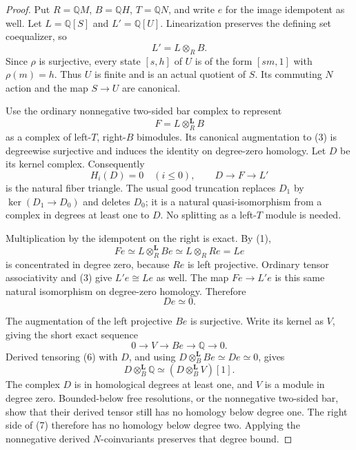 \begin{proof}
Put $R=\mathbb QM$, $B=\mathbb QH$, $T=\mathbb QN$, and write $e$
for the image idempotent as well.  Let $L=\mathbb Q[S]$ and
$L'=\mathbb Q[U]$.
Linearization preserves the defining set coequalizer, so
\[
 L'=L\otimes_R B.                                               \tag{3}
\]
Since $\rho$ is surjective, every state $[s,h]$ of $U$ is of the form
$[sm,1]$ with $\rho(m)=h$.  Thus $U$ is finite and is an actual quotient
of $S$.  Its commuting $N$ action and the map $S\to U$ are canonical.

Use the ordinary nonnegative two-sided bar complex to represent
\[
 F=L\otimes_R^{\mathbf L}B
\]
as a complex of left-$T$, right-$B$ bimodules.  Its canonical
augmentation to (3) is degreewise surjective and induces the identity
on degree-zero homology.  Let $D$ be its kernel complex.  Consequently
\[
 H_i(D)=0\quad(i\leq0),\qquad
 D\longrightarrow F\longrightarrow L'
                                                               \tag{4}
\]
is the natural fiber triangle.  The usual good truncation replaces
$D_1$ by $\ker(D_1\to D_0)$ and deletes $D_0$; it is a natural
quasi-isomorphism from a complex in degrees at least one to $D$.
No splitting as a left-$T$ module is needed.

Multiplication by the idempotent on the right is exact.  By (1),
\[
 Fe\simeq L\otimes_R^{\mathbf L}Be
      \simeq L\otimes_R Re=Le
\]
is concentrated in degree zero, because $Re$ is left projective.
Ordinary tensor associativity and (3) give $L'e\cong Le$ as well.
The map $Fe\to L'e$ is this same natural isomorphism on degree-zero
homology.  Therefore
\[
 De\simeq0.                                                    \tag{5}
\]

The augmentation of the left projective $Be$ is surjective.  Write its
kernel as $V$, giving the short exact sequence
\[
 0\longrightarrow V\longrightarrow Be\longrightarrow\mathbb Q
          \longrightarrow0.                                  \tag{6}
\]
Derived tensoring (6) with $D$, and using
$D\otimes_B^{\mathbf L}Be\simeq De\simeq0$, gives
\[
 D\otimes_B^{\mathbf L}\mathbb Q
       \simeq (D\otimes_B^{\mathbf L}V)[1].                    \tag{7}
\]
The complex $D$ is in homological degrees at least one, and $V$ is a
module in degree zero.  Bounded-below free resolutions, or the
nonnegative two-sided bar, show that their derived tensor still has
no homology below degree one.  The right side of (7) therefore has
no homology below degree two.  Applying the nonnegative derived
$N$-coinvariants preserves that degree bound.


\end{proof}
